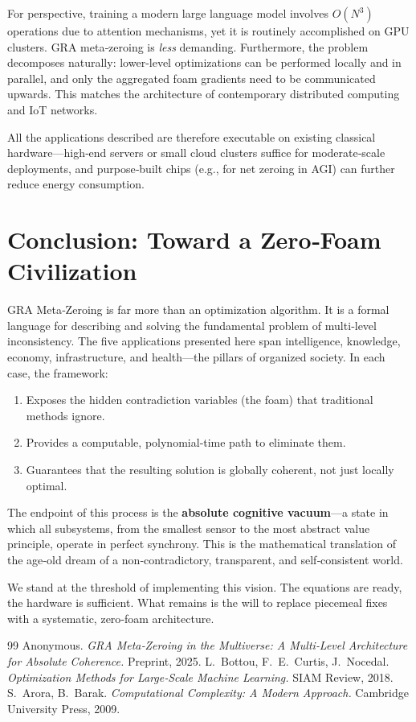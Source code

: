 \documentclass[11pt,a4paper]{article}
\theoremstyle{definition}
\begin{document}
For perspective, training a modern large language model involves $O(N^3)$ operations due to attention mechanisms, yet it is routinely accomplished on GPU clusters. GRA meta‑zeroing is \emph{less} demanding. Furthermore, the problem decomposes naturally: lower‑level optimizations can be performed locally and in parallel, and only the aggregated foam gradients need to be communicated upwards. This matches the architecture of contemporary distributed computing and IoT networks.

All the applications described are therefore executable on existing classical hardware---high‑end servers or small cloud clusters suffice for moderate‑scale deployments, and purpose‑built chips (e.g., for net zeroing in AGI) can further reduce energy consumption.

\section{Conclusion: Toward a Zero‑Foam Civilization}

GRA Meta‑Zeroing is far more than an optimization algorithm. It is a formal language for describing and solving the fundamental problem of multi‑level inconsistency. The five applications presented here span intelligence, knowledge, economy, infrastructure, and health---the pillars of organized society.
In each case, the framework:
\begin{enumerate}
    \item Exposes the hidden contradiction variables (the foam) that traditional methods ignore.
    \item Provides a computable, polynomial‑time path to eliminate them.
    \item Guarantees that the resulting solution is globally coherent, not just locally optimal.
\end{enumerate}

The endpoint of this process is the \textbf{absolute cognitive vacuum}---a state in which all subsystems, from the smallest sensor to the most abstract value principle, operate in perfect synchrony. This is the mathematical translation of the age‑old dream of a non‑contradictory, transparent, and self‑consistent world.

We stand at the threshold of implementing this vision. The equations are ready, the hardware is sufficient. What remains is the will to replace piecemeal fixes with a systematic, zero‑foam architecture.

\begin{thebibliography}{99}
Anonymous. \textit{GRA Meta‑Zeroing in the Multiverse: A Multi‑Level Architecture for Absolute Coherence.} Preprint, 2025.
L.~Bottou, F.~E.~Curtis, J.~Nocedal. \textit{Optimization Methods for Large‑Scale Machine Learning.} SIAM Review, 2018.
S.~Arora, B.~Barak. \textit{Computational Complexity: A Modern Approach.} Cambridge University Press, 2009.
\end{thebibliography}
\end{document}
